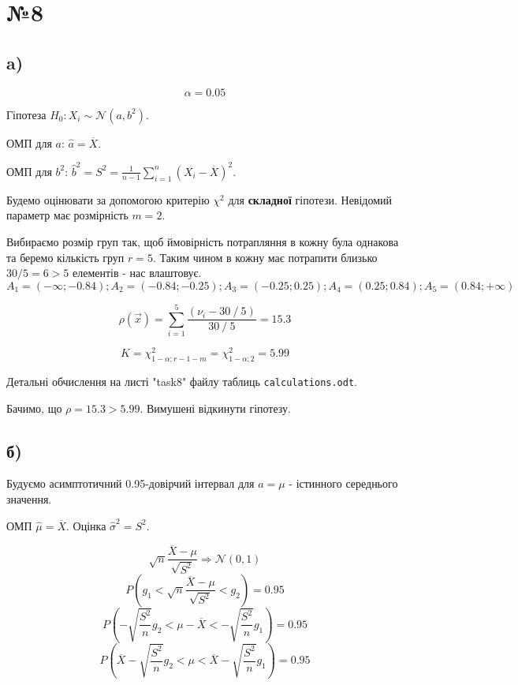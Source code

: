 \documentclass[11pt, a4paper]{article} %
\begin{document}
\section*{№8}

\subsection*{a)}
$$\alpha=0.05$$

Гіпотеза $H_0 : X_i \sim \mathcal N(a, b^2)$.

ОМП для $a$: $\hat a = \overline X$.

ОМП для $b^2$: $\hat b^2 = S^2 = \frac{1}{n-1} \sum_{i=1}^n (X_i - \overline X)^2$.

Будемо оцінювати за допомогою критерію $\chi^2$ для \textbf{складної} гіпотези.
Невідомий параметр має розмірність $m=2$.

Вибираємо розмір груп так, щоб ймовірність потрапляння в кожну була однакова та беремо кількість груп $r = 5$. 
Таким чином в кожну має потрапити близько $30/5 = 6 > 5$ елементів - нас влаштовує. 
$$A_1 = (-\infty; -0.84); A_2 = (-0.84; -0.25); A_3 = (-0.25; 0.25); A_4 = (0.25; 0.84); A_5 = (0.84; +\infty)$$

$$\rho(\vec x) = \sum_{i=1}^5 \frac{(\nu_i - 30\fracslash 5)}{30 \fracslash 5} = 15.3$$

$$K = \chi^2_{1-\alpha; r-1-m} = \chi^2_{1-\alpha; 2} = 5.99$$

Детальні обчислення на листі "task8" файлу таблиць \texttt{calculations.odt}.

\begin{mdframed}[style=ans]
    Бачимо, що $\rho = 15.3 > 5.99$.
    Вимушені відкинути гіпотезу.
\end{mdframed}

\subsection*{б)}
Будуємо асимптотичний 0.95-довірчий інтервал для $a=\mu$ - істинного середнього значення.

ОМП $\hat \mu = \overline X$.
Оцінка $\hat \sigma^2 = S^2$.

$$\sqrt{n} \frac{\overline X - \mu}{\sqrt{S^2}} \Longrightarrow \mathcal N(0,1)$$
$$P(g_1 < \sqrt{n} \frac{\overline X - \mu}{\sqrt{S^2}} < g_2) = 0.95$$
$$P(-\sqrt{\frac{S^2}{n}} g_2 < \mu - \overline{X} < -\sqrt{\frac{S^2}{n}} g_1) = 0.95$$
$$P( \overline X - \sqrt{\frac{S^2}{n}} g_2 < \mu < \overline X - \sqrt{\frac{S^2}{n}} g_1) = 0.95$$
\end{document}
